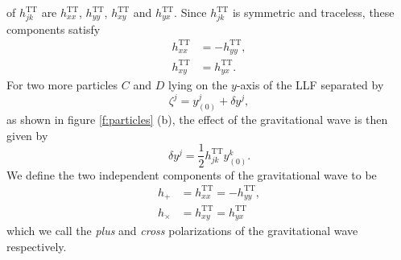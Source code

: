 of $h_{jk}^\mathrm{TT}$ are $h_{xx}^\mathrm{TT}$, $h_{yy}^\mathrm{TT}$,
$h_{xy}^\mathrm{TT}$ and $h_{yx}^\mathrm{TT}$. Since $h_{jk}^\mathrm{TT}$ is
symmetric and traceless, these components satisfy
\begin{align}
h_{xx}^\mathrm{TT} &= - h_{yy}^\mathrm{TT}, \\
h_{xy}^\mathrm{TT} &= h_{yx}^\mathrm{TT}.
\end{align}
For two more particles $C$ and $D$ lying on the $y$-axis of the LLF
separated by 
\begin{equation}
\zeta^j = y^j_{(0)} + \delta y^j,
\end{equation}
as shown in figure \ref{f:particles} (b), the effect of the gravitational wave
is then given by 
\begin{equation}
\delta y^j = \frac{1}{2} h_{jk}^\mathrm{TT} y_{(0)}^k.
\end{equation}
We define the two independent components of the gravitational wave to be
\begin{align}
h_{+} &= h_{xx}^\mathrm{TT} = - h_{yy}^\mathrm{TT}, \\
h_{\times} &= h_{xy}^\mathrm{TT} = h_{yx}^\mathrm{TT}
\end{align}
which we call the \emph{plus} and \emph{cross} polarizations of the
gravitational wave respectively.

